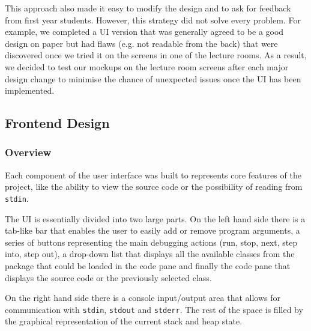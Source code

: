 \documentclass[11pt, a4paper]{article}
\begin{document}
This approach also made it easy to modify the design and to ask for feedback from first year students.
However, this strategy did not solve every problem.
For example, we completed a UI version that was generally agreed to be a good design on paper but had flaws (e.g. not readable from the back) that were discovered once we tried it on the screens in one of the lecture rooms.
As a result, we decided to test our mockups on the lecture room screens after each major design change to minimise the chance of unexpected issues once the UI has been implemented.

\subsection{Frontend Design}
\subsubsection{Overview}

Each component of the user interface was built to represents core features of the project, like the ability to view the source code or the possibility of reading from \texttt{stdin}.

The UI is essentially divided into two large parts.
On the left hand side there is a tab-like bar that enables the user to easily add or remove program arguments, a series of buttons representing the main debugging actions (run, stop, next, step into, step out), a drop-down list that displays all the available classes from the package that could be loaded in the code pane and finally the code pane that displays the source code or the previously selected class.

On the right hand side there is a console input/output area that allows for communication with \texttt{stdin}, \texttt{stdout} and \texttt{stderr}. The rest of the space is filled by the graphical representation of the current stack and heap state.
\end{document}

